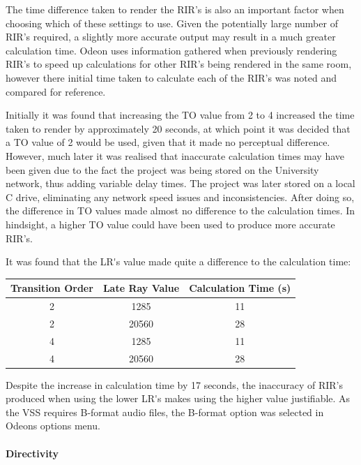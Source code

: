 \documentclass[../../main.tex]{subfiles}
\begin{document}
				The time difference taken to render the \ac{RIR}'s is also an important factor when choosing which of these settings to use. Given the potentially large number of \ac{RIR}'s required, a slightly more accurate output may result in a much greater calculation time. Odeon uses information gathered when previously rendering \ac{RIR}'s to speed up calculations for other \ac{RIR}'s being rendered in the same room, however there initial time taken to calculate each of the \ac{RIR}'s was noted and compared for reference.

				Initially it was found that increasing the \ac{TO} value from 2 to 4 increased the time taken to render by approximately 20 seconds, at which point it was decided that a \ac{TO} value of 2 would be used, given that it made no perceptual difference. However, much later it was realised that inaccurate calculation times may have been given due to the fact the project was being stored on the University network, thus adding variable delay times. The project was later stored on a local C drive, eliminating any network speed issues and inconsistencies. After doing so, the difference in \ac{TO} values made almost no difference to the calculation times. In hindsight, a higher \ac{TO} value could have been used to produce more accurate \ac{RIR}'s.

				It was found that the \ac{LR's} value made quite a difference to the calculation time:

				\begin{center}
					\begin{tabular}{c c c}
					\textbf{Transition Order} & \textbf{Late Ray Value} & \textbf{Calculation Time (s)} \\ \hline
					2 & 1285 & 11 \\
					2 & 20560 & 28 \\
					4 & 1285 & 11 \\
					4 & 20560 & 28 \\
					\end{tabular}
				\end{center}

				Despite the increase in calculation time by 17 seconds, the inaccuracy of \ac{RIR}'s produced when using the lower \ac{LR's} makes using the higher value justifiable. As the \ac{VSS} requires B-format audio files, the B-format option was selected in Odeons options menu.



			\paragraph{Directivity}
\end{document}
